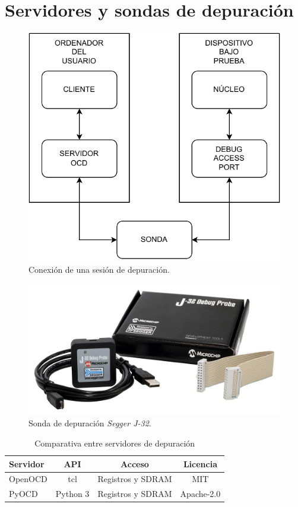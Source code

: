 \section{Servidores y sondas de depuración}
\label{sec:depuracion}

\begin{figure}[htbp]
	\centering
	\includegraphics[width=.8\textwidth]{./Figures/debug.pdf}
    \caption{Conexión de una sesión de depuración.}
	\label{fig:debug}
\end{figure}

\begin{figure}[htbp]
	\centering
	\includegraphics[width=.8\textwidth]{./Figures/segger.jpg}
    \caption{Sonda de depuración \emph{Segger J-32}.}
	\label{fig:sonda}
\end{figure}



\begin{table}[h]
	\centering
	\caption[Servidores de depuración]{Comparativa entre servidores de depuración}
	\begin{tabular}{l c c c}    
		\toprule
        \textbf{Servidor} & \textbf{API} & \textbf{Acceso}   & \textbf{Licencia}\\
		\midrule
        OpenOCD           & tcl                         & Registros y SDRAM & MIT\\        	
        PyOCD             & Python 3                    & Registros y SDRAM & Apache-2.0\\
		\bottomrule
		\hline
	\end{tabular}
	\label{tab:servidores}
\end{table}

